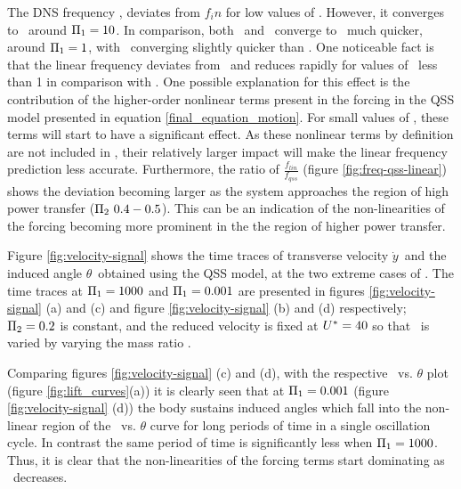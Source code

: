The DNS frequency \freqdns, deviates from $f_in$ for low values of \massstiff. However, it converges to \freqinput\ around $\Pi_1=10$. In comparison, both \freqlin\ and \freqqss\ converge to \freqinput\ much quicker, around $\Pi_1 = 1$, with \freqlin\ converging slightly quicker than \freqqss. One noticeable fact is that the linear frequency deviates from \freqinput\ and reduces rapidly for values of \massstiff\ less than 1 in comparison with \freqqss. One possible explanation for this effect is the contribution of the higher-order nonlinear terms present in the forcing in the QSS model presented in equation \ref{final_equation_motion}. For small values of \massstiff, these terms will start to have a significant effect. As these nonlinear terms by definition are not included in \freqlin, their relatively larger impact will make the linear frequency prediction less accurate. Furthermore, the ratio of $\frac{f_{lin}}{f_{qss}}$ (figure \ref{fig:freq-qss-linear}) shows the deviation becoming larger as the system approaches the region of high power transfer ($\massdamp\ 0.4-0.5$). This can be an indication of the non-linearities of the forcing becoming more prominent in the the region of higher power transfer.




          

Figure \ref{fig:velocity-signal} shows the time traces of transverse velocity $\dot{y}$\ and the induced angle $\theta$\ obtained using the QSS model, at the two extreme cases of \massstiff. The time traces at $\Pi_1=1000$ and $\Pi_1=0.001$ are presented in figures  \ref{fig:velocity-signal} (a) and (c) and  figure \ref{fig:velocity-signal} (b) and (d) respectively; $\Pi_2=0.2$ is constant, and the reduced velocity is fixed at $U^{*}=40$ so that \massstiff\ is varied by varying the mass ratio \mstar.

Comparing figures \ref{fig:velocity-signal} (c) and (d), with the respective \cy\ vs. $\theta$ plot (figure \ref{fig:lift_curves}(a)) it is clearly seen that at $\Pi_1=0.001$ (figure \ref{fig:velocity-signal} (d)) the body sustains induced angles which fall into the non-linear region of the \cy\ vs. $\theta$ curve for long periods of time in a single oscillation cycle. In contrast the same period of time is significantly less when $\Pi_1=1000$. Thus, it is clear that the non-linearities of the forcing terms start dominating as \massstiff\ decreases. 

